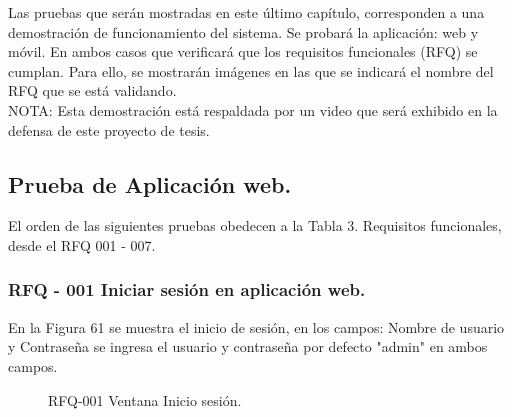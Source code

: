 Las pruebas que serán mostradas en este último capítulo, corresponden a una demostración de funcionamiento del sistema. Se probará la aplicación: web y móvil. En ambos casos que verificará que los requisitos funcionales (RFQ) se cumplan. Para ello, se mostrarán imágenes en las que se indicará el nombre del RFQ que se está validando.\\

NOTA: Esta demostración está respaldada por un video que será exhibido en la defensa de este proyecto de tesis.\\

\subsection{Prueba de Aplicación web.}

El orden de las siguientes pruebas obedecen a la Tabla 3. Requisitos funcionales, desde el RFQ 001 - 007.

\subsubsection{RFQ - 001 Iniciar sesión en aplicación web.}

En la Figura 61 se muestra el inicio de sesión, en los campos: Nombre de usuario y Contraseña se ingresa el usuario y contraseña por defecto "admin" en ambos campos.

\begin{figure}[H]
\centering
\setlength\fboxsep{0pt}
\setlength\fboxrule{0.5pt}
\caption{RFQ-001 Ventana Inicio sesión.}
\label{rfq001}
\end{figure}


